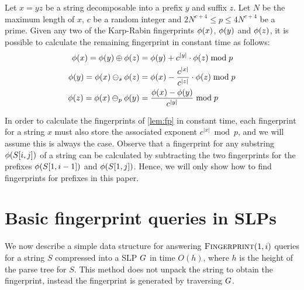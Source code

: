 \begin{lemma}\label{lem:fp}
Let $x = y z$ be a string decomposable into a prefix $y$ and suffix $z$. Let $N$ be the maximum length of $x$, $c$ be a random integer and $2N^{c+4} \leq p \leq 4N^{c+4}$ be a prime. Given any two of the Karp-Rabin fingerprints $\phi(x)$, $\phi(y)$ and $\phi(z)$, it is possible to calculate the remaining fingerprint in constant time as follows:
\begin{align*}
	\phi(x) = \phi(y) \oplus \phi(z) &= \phi(y) + c^{|y|} \cdot \phi(z) \bmod p \\
	\phi(y) = \phi(x) \ominus_s \phi(z) &= \phi(x) - \frac{c^{|x|}}{c^{|z|}} \cdot \phi(z) \bmod p \\
	\phi(z) = \phi(x) \ominus_p \phi(y) &= \frac{\phi(x) - \phi(y)}{c^{|y|}} \bmod p
\end{align*}
\end{lemma}

\noindent In order to calculate the fingerprints of \autoref{lem:fp} in constant time, each fingerprint for a string $x$ must also store the associated exponent $c^{|x|} \bmod p$, and we will assume this is always the case. Observe that a fingerprint for any substring $\phi(S[i, j])$ of a string can be calculated by subtracting the two fingerprints for the prefixes $\phi(S[1, i-1])$ and $\phi(S[1, j])$. Hence, we will only show how to find fingerprints for prefixes in this paper.

\section{Basic fingerprint queries in SLPs}
We now describe a simple data structure for answering $\textsc{Fingerprint}(1, i)$ queries for a string $S$ compressed into a SLP $G$ in time $O(h)$, where $h$ is the height of the parse tree for $S$. This method does not unpack the string to obtain the fingerprint, instead the fingerprint is generated by traversing $G$. 


